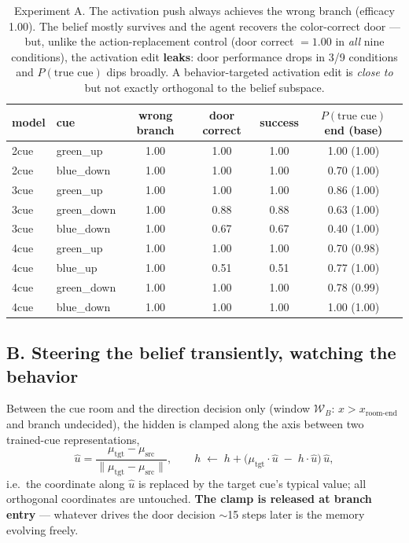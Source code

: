 \documentclass[11pt]{article}
\newcommand{\ok}[1]{\textcolor{envgreen}{#1}}
\newcommand{\bad}[1]{\textcolor{warnred}{#1}}
\begin{document}
\begin{table}[h]
\centering\small
\begin{tabular}{llcccc}
\toprule
model & cue & wrong branch & door correct & success & $P(\text{true cue})$ end (base) \\
\midrule
2cue & green\_up   & 1.00 & \ok{1.00} & \ok{1.00} & 1.00 (1.00) \\
2cue & blue\_down  & 1.00 & \ok{1.00} & \ok{1.00} & 0.70 (1.00) \\
3cue & green\_up   & 1.00 & \ok{1.00} & \ok{1.00} & 0.86 (1.00) \\
3cue & green\_down & 1.00 & 0.88 & 0.88 & 0.63 (1.00) \\
3cue & blue\_down  & 1.00 & \bad{0.67} & \bad{0.67} & 0.40 (1.00) \\
4cue & green\_up   & 1.00 & \ok{1.00} & \ok{1.00} & 0.70 (0.98) \\
4cue & blue\_up    & 1.00 & \bad{0.51} & \bad{0.51} & 0.77 (1.00) \\
4cue & green\_down & 1.00 & \ok{1.00} & \ok{1.00} & 0.78 (0.99) \\
4cue & blue\_down  & 1.00 & \ok{1.00} & \ok{1.00} & 1.00 (1.00) \\
\bottomrule
\end{tabular}
\caption{Experiment A. The activation push always achieves the wrong branch (efficacy 1.00). The
belief mostly survives and the agent recovers the color-correct door --- but, unlike the
action-replacement control (door correct $=1.00$ in \emph{all} nine conditions), the activation
edit \textbf{leaks}: door performance drops in 3/9 conditions and $P(\text{true cue})$ dips
broadly. A behavior-targeted activation edit is \emph{close to} but not exactly orthogonal to the
belief subspace.}
\label{tab:expA}
\end{table}

\subsection{B. Steering the belief transiently, watching the behavior}

Between the cue room and the direction decision only (window $\mathcal{W}_B$:
$x > x_{\text{room-end}}$ and branch undecided), the hidden is clamped along the axis between two
trained-cue representations,
\[
\hat u = \frac{\mu_{\text{tgt}} - \mu_{\text{src}}}{\lVert \mu_{\text{tgt}} - \mu_{\text{src}} \rVert},
\qquad
h \;\leftarrow\; h + \big(\mu_{\text{tgt}}\!\cdot\hat u \;-\; h\!\cdot\hat u\big)\,\hat u ,
\]
i.e.\ the coordinate along $\hat u$ is replaced by the target cue's typical value; all orthogonal
coordinates are untouched. \textbf{The clamp is released at branch entry} --- whatever drives the
door decision $\sim$15 steps later is the memory evolving freely.
\end{document}
